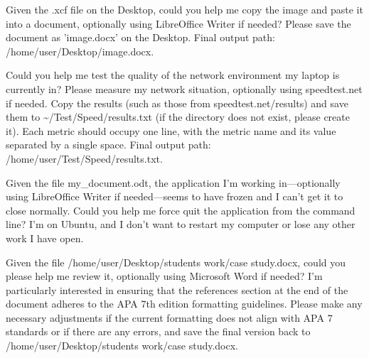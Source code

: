 \begin{instructionbox}
Given the .xcf file on the Desktop, could you help me copy the image and paste it into a document, optionally using LibreOffice Writer if needed? Please save the document as 'image.docx' on the Desktop. Final output path: \textasciigrave{}/home/user/Desktop/image.docx\textasciigrave{}.
\end{instructionbox}

\begin{instructionbox}
Could you help me test the quality of the network environment my laptop is currently in? Please measure my network situation, optionally using speedtest.net if needed. Copy the results (such as those from speedtest.net/results) and save them to \textasciigrave{}\textasciitilde{}/Test/Speed/results.txt\textasciigrave{} (if the directory does not exist, please create it). Each metric should occupy one line, with the metric name and its value separated by a single space. Final output path: \textasciigrave{}/home/user/Test/Speed/results.txt\textasciigrave{}.
\end{instructionbox}

\begin{instructionbox}
Given the file my\_document.odt, the application I'm working in---optionally using LibreOffice Writer if needed---seems to have frozen and I can't get it to close normally. Could you help me force quit the application from the command line? I'm on Ubuntu, and I don't want to restart my computer or lose any other work I have open.
\end{instructionbox}

\begin{instructionbox}
Given the file \textasciigrave{}/home/user/Desktop/students work/case study.docx\textasciigrave{}, could you please help me review it, optionally using Microsoft Word if needed? I'm particularly interested in ensuring that the references section at the end of the document adheres to the APA 7th edition formatting guidelines. Please make any necessary adjustments if the current formatting does not align with APA 7 standards or if there are any errors, and save the final version back to \textasciigrave{}/home/user/Desktop/students work/case study.docx\textasciigrave{}.
\end{instructionbox}

